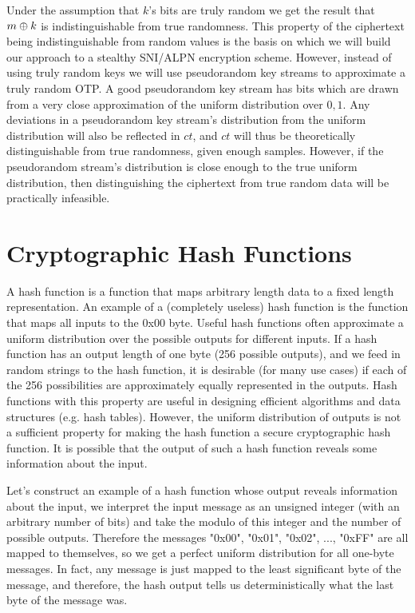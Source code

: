 Under the assumption that $k$'s bits are truly random we get the result that $m\oplus k$ is indistinguishable from true randomness. This property of the ciphertext being indistinguishable from random values is the basis on which we will build our approach to a stealthy \ac{SNI}/\ac{ALPN} encryption scheme. However, instead of using truly random keys we will use pseudorandom key streams to approximate a truly random \ac{OTP}. A good pseudorandom key stream has bits which are drawn from a very close approximation of the uniform distribution over ${0,1}$. Any deviations in a pseudorandom key stream's distribution from the uniform distribution will also be reflected in $ct$, and $ct$ will thus be theoretically distinguishable from true randomness, given enough samples. However, if the pseudorandom stream's distribution is close enough to the true uniform distribution, then distinguishing the ciphertext from true random data will be practically infeasible.

\section{Cryptographic Hash Functions}
A hash function is a function that maps arbitrary length data to a fixed length representation. An example of a (completely useless) hash function is the function that maps all inputs to the 0x00 byte. Useful hash functions often approximate a uniform distribution over the possible outputs for different inputs. If a hash function has an output length of one byte (256 possible outputs), and we feed in random strings to the hash function, it is desirable (for many use cases) if each of the 256 possibilities are approximately equally represented in the outputs. Hash functions with this property are useful in designing efficient algorithms and data structures (e.g. hash tables). However, the uniform distribution of outputs is not a sufficient property for making the hash function a secure cryptographic hash function. It is possible that the output of such a hash function reveals some information about the input.

Let's construct an example of a hash function whose output reveals information about the input, we interpret the input message as an unsigned integer (with an arbitrary number of bits) and take the modulo of this integer and the number of possible outputs. Therefore the messages "0x00", "0x01", "0x02", ..., "0xFF" are all mapped to themselves, so we get a perfect uniform distribution for all one-byte messages. In fact, any message is just mapped to the least significant byte of the message, and therefore, the hash output tells us deterministically what the last byte of the message was.

